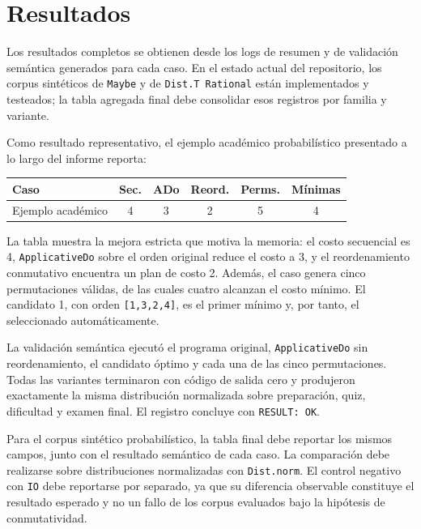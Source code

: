 
\section{Resultados}

Los resultados completos se obtienen desde los logs de resumen y de validación semántica generados para cada caso. En el estado actual del repositorio, los corpus sintéticos de \texttt{Maybe} y de \texttt{Dist.T Rational} están implementados y testeados; la tabla agregada final debe consolidar esos registros por familia y variante.

Como resultado representativo, el ejemplo académico probabilístico presentado a lo largo del informe reporta:

\begin{center}
\begin{tabular}{lccccc}
\hline
Caso & Sec. & ADo & Reord. & Perms. & Mínimas \\
\hline
Ejemplo académico & 4 & 3 & 2 & 5 & 4 \\
\hline
\end{tabular}
\end{center}

La tabla muestra la mejora estricta que motiva la memoria: el costo secuencial es 4, \texttt{ApplicativeDo} sobre el orden original reduce el costo a 3, y el reordenamiento conmutativo encuentra un plan de costo 2. Además, el caso genera cinco permutaciones válidas, de las cuales cuatro alcanzan el costo mínimo. El candidato 1, con orden \texttt{[1,3,2,4]}, es el primer mínimo y, por tanto, el seleccionado automáticamente.

La validación semántica ejecutó el programa original, \texttt{ApplicativeDo} sin reordenamiento, el candidato óptimo y cada una de las cinco permutaciones. Todas las variantes terminaron con código de salida cero y produjeron exactamente la misma distribución normalizada sobre preparación, quiz, dificultad y examen final. El registro  concluye con \texttt{RESULT: OK}.

Para el corpus sintético probabilístico, la tabla final debe reportar los mismos campos, junto con el resultado semántico de cada caso. La comparación debe realizarse sobre distribuciones normalizadas con \texttt{Dist.norm}. El control negativo con \texttt{IO} debe reportarse por separado, ya que su diferencia observable constituye el resultado esperado y no un fallo de los corpus evaluados bajo la hipótesis de conmutatividad.
